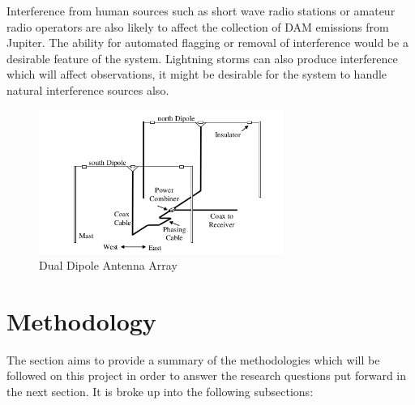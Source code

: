 Interference from human sources such as short wave radio stations or amateur radio operators are also likely to affect the collection of \gls{DAM} emissions from Jupiter. The ability for automated flagging or removal of interference would be a desirable feature of the system. Lightning storms can also produce interference which will affect observations, it might be desirable for the system to handle natural interference sources also.

%
\begin{figure}[here]
\centering
\includegraphics[width=8cm]{images/08}
\caption{Dual Dipole Antenna Array \citep{nasa12}}
\label{fig:dual_dipole_antenna_array}
\end{figure}
%

\newpage
\section*{Methodology}
The section aims to provide a summary of the methodologies which will be followed on this project in order to answer the research questions put forward in the next section. It is broke up into the following subsections:

